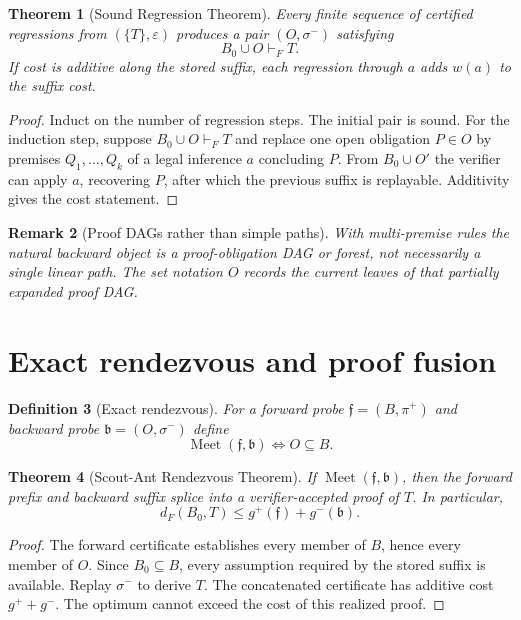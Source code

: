 \documentclass[11pt]{article}
\newtheorem{definition}{Definition}[section]
\newtheorem{theorem}[definition]{Theorem}
\newtheorem{remark}[definition]{Remark}
\newcommand{\Meet}{\operatorname{Meet}}
\begin{document}
\begin{theorem}[Sound Regression Theorem]
Every finite sequence of certified regressions from $(\{T\},\varepsilon)$ produces a pair $(O,\sigma^-)$ satisfying
\[
B_0\cup O\vdash_F T.
\]
If cost is additive along the stored suffix, each regression through $a$ adds $w(a)$ to the suffix cost.
\end{theorem}

\begin{proof}
Induct on the number of regression steps. The initial pair is sound. For the induction step, suppose $B_0\cup O\vdash_F T$ and replace one open obligation $P\in O$ by premises $Q_1,\ldots,Q_k$ of a legal inference $a$ concluding $P$. From $B_0\cup O'$ the verifier can apply $a$, recovering $P$, after which the previous suffix is replayable. Additivity gives the cost statement.
\end{proof}

\begin{remark}[Proof DAGs rather than simple paths]
With multi-premise rules the natural backward object is a proof-obligation DAG or forest, not necessarily a single linear path. The set notation $O$ records the current leaves of that partially expanded proof DAG.
\end{remark}

\section{Exact rendezvous and proof fusion}

\begin{definition}[Exact rendezvous]
For a forward probe $\mathfrak f=(B,\pi^+)$ and backward probe $\mathfrak b=(O,\sigma^-)$ define
\[
\Meet(\mathfrak f,\mathfrak b)\iff O\subseteq B.
\]
\end{definition}

\begin{theorem}[Scout-Ant Rendezvous Theorem]
If $\Meet(\mathfrak f,\mathfrak b)$, then the forward prefix and backward suffix splice into a verifier-accepted proof of $T$. In particular,
\[
d_F(B_0,T)\le g^+(\mathfrak f)+g^-(\mathfrak b).
\]
\end{theorem}

\begin{proof}
The forward certificate establishes every member of $B$, hence every member of $O$. Since $B_0\subseteq B$, every assumption required by the stored suffix is available. Replay $\sigma^-$ to derive $T$. The concatenated certificate has additive cost $g^++g^-$. The optimum cannot exceed the cost of this realized proof.
\end{proof}
\end{document}
